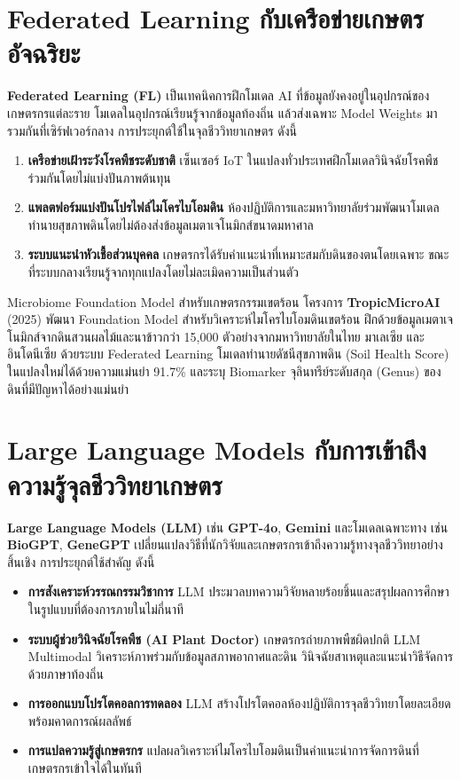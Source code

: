 \section{Federated Learning กับเครือข่ายเกษตรอัจฉริยะ}

\textbf{Federated Learning (FL)} เป็นเทคนิคการฝึกโมเดล AI ที่ข้อมูลยังคงอยู่ในอุปกรณ์ของเกษตรกรแต่ละราย โมเดลในอุปกรณ์เรียนรู้จากข้อมูลท้องถิ่น แล้วส่งเฉพาะ Model Weights มารวมกันที่เซิร์ฟเวอร์กลาง การประยุกต์ใช้ในจุลชีววิทยาเกษตร ดังนี้
\begin{enumerate}
    \item \textbf{เครือข่ายเฝ้าระวังโรคพืชระดับชาติ} เซ็นเซอร์ IoT ในแปลงทั่วประเทศฝึกโมเดลวินิจฉัยโรคพืชร่วมกันโดยไม่แบ่งปันภาพต้นทุน
    \item \textbf{แพลตฟอร์มแบ่งปันโปรไฟล์ไมโครไบโอมดิน} ห้องปฏิบัติการและมหาวิทยาลัยร่วมพัฒนาโมเดลทำนายสุขภาพดินโดยไม่ต้องส่งข้อมูลเมตาเจโนมิกส์ขนาดมหาศาล
    \item \textbf{ระบบแนะนำหัวเชื้อส่วนบุคคล} เกษตรกรได้รับคำแนะนำที่เหมาะสมกับดินของตนโดยเฉพาะ ขณะที่ระบบกลางเรียนรู้จากทุกแปลงโดยไม่ละเมิดความเป็นส่วนตัว
\end{enumerate}

\begin{casestudy}{Microbiome Foundation Model สำหรับเกษตรกรรมเขตร้อน}
โครงการ \textbf{TropicMicroAI} (2025) พัฒนา Foundation Model สำหรับวิเคราะห์ไมโครไบโอมดินเขตร้อน ฝึกด้วยข้อมูลเมตาเจโนมิกส์จากดินสวนผลไม้และนาข้าวกว่า 15{,}000 ตัวอย่างจากมหาวิทยาลัยในไทย มาเลเซีย และอินโดนีเซีย ด้วยระบบ Federated Learning โมเดลทำนายดัชนีสุขภาพดิน (Soil Health Score) ในแปลงใหม่ได้ด้วยความแม่นยำ 91.7\% และระบุ Biomarker จุลินทรีย์ระดับสกุล (Genus) ของดินที่มีปัญหาได้อย่างแม่นยำ
\end{casestudy}

\section{Large Language Models กับการเข้าถึงความรู้จุลชีววิทยาเกษตร}

\textbf{Large Language Models (LLM)} เช่น \textbf{GPT-4o}, \textbf{Gemini} และโมเดลเฉพาะทาง เช่น \textbf{BioGPT}, \textbf{GeneGPT} เปลี่ยนแปลงวิธีที่นักวิจัยและเกษตรกรเข้าถึงความรู้ทางจุลชีววิทยาอย่างสิ้นเชิง การประยุกต์ใช้สำคัญ ดังนี้
\begin{itemize}
    \item \textbf{การสังเคราะห์วรรณกรรมวิชาการ} LLM ประมวลบทความวิจัยหลายร้อยชิ้นและสรุปผลการศึกษาในรูปแบบที่ต้องการภายในไม่กี่นาที
    \item \textbf{ระบบผู้ช่วยวินิจฉัยโรคพืช (AI Plant Doctor)} เกษตรกรถ่ายภาพพืชผิดปกติ LLM Multimodal วิเคราะห์ภาพร่วมกับข้อมูลสภาพอากาศและดิน วินิจฉัยสาเหตุและแนะนำวิธีจัดการด้วยภาษาท้องถิ่น
    \item \textbf{การออกแบบโปรโตคอลการทดลอง} LLM สร้างโปรโตคอลห้องปฏิบัติการจุลชีววิทยาโดยละเอียดพร้อมคาดการณ์ผลลัพธ์
    \item \textbf{การแปลความรู้สู่เกษตรกร} แปลผลวิเคราะห์ไมโครไบโอมดินเป็นคำแนะนำการจัดการดินที่เกษตรกรเข้าใจได้ในทันที
\end{itemize}

